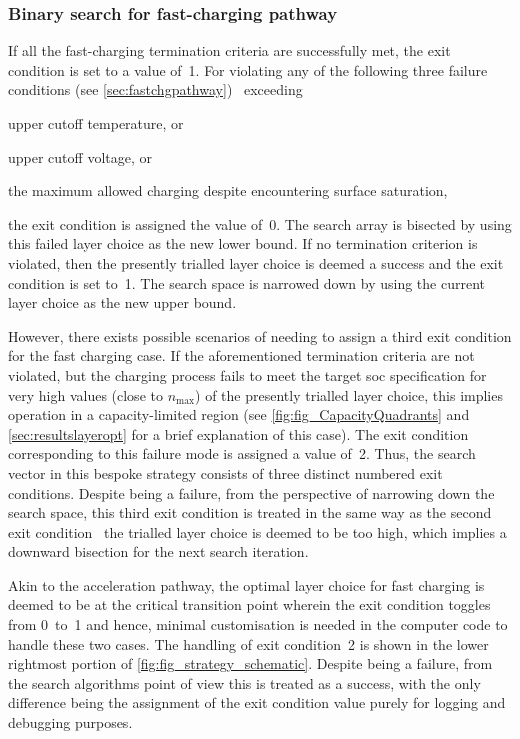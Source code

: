 \subsubsection*{Binary search for fast-charging pathway}

If all  the fast-charging  termination criteria are  successfully met,  the exit
condition is  set to  a value  of~1. For  violating any  of the  following three
failure conditions (see \cref{sec:fastchgpathway}) \viz~exceeding
\begin{enumerate*}[label=\itshape\alph*\upshape)]
    \item upper cutoff temperature,  or
    \item upper cutoff voltage, or
    \item the maximum allowed charging despite encountering surface saturation,
\end{enumerate*}
the exit condition is  assigned the value of~0. The search  array is bisected by
using  this failed  layer  choice as  the  new lower  bound.  If no  termination
criterion is  violated, then  the presently  trialled layer  choice is  deemed a
success and the exit condition is set to~1. The search space is narrowed down by
using the current layer choice as the new upper bound.

However,  there exists  possible scenarios of needing to assign a  third exit
condition  for the  fast charging case.  If the  aforementioned termination
criteria  are not  violated, but  the charging process fails to meet  the target
\gls{soc} specification for very high values (close to $n_\text{max}$) of the
presently trialled layer choice,  this implies operation in a capacity-limited
region (see \cref{fig:fig_CapacityQuadrants} and \cref{sec:resultslayeropt} for
a brief explanation of this  case). The exit condition corresponding to this
failure mode is assigned a value of~2. Thus, the search vector in this bespoke
strategy  consists of three distinct numbered exit conditions. Despite being a
failure, from  the perspective of narrowing down the search space,  this third
exit condition is treated  in the same way  as the  second exit condition
\ie~the trialled layer choice is deemed to be too high, which implies a downward
bisection for the next search iteration.

Akin to the acceleration pathway, the  optimal layer choice for fast charging is
deemed to be at the critical transition point wherein the exit condition toggles
from 0~to~1 and  hence, minimal customisation is needed in  the computer code to
handle these two cases.  The handling of exit condition~2 is  shown in the lower
rightmost portion of \cref{fig:fig_strategy_schematic}. Despite being a failure,
from the search algorithms point of view  this is treated as a success, with the
only difference  being the  assignment of  the exit  condition value  purely for
logging and debugging purposes.

